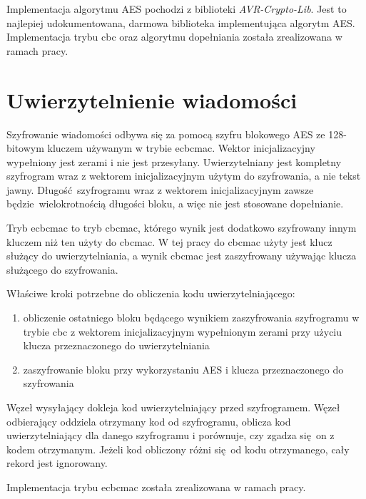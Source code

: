 Implementacja algorytmu AES pochodzi z biblioteki \emph{AVR-Crypto-Lib}. Jest to najlepiej udokumentowana, darmowa biblioteka implementująca algorytm AES. Implementacja trybu \gls{cbc} oraz algorytmu dopełniania została zrealizowana w ramach pracy.

\section{Uwierzytelnienie wiadomości}
\label{sec:auth}

Szyfrowanie wiadomości odbywa się za pomocą szyfru blokowego AES ze 128-bitowym kluczem używanym w trybie \gls{ecbcmac}. Wektor inicjalizacyjny wypełniony jest zerami i nie jest przesyłany. Uwierzytelniany jest kompletny szyfrogram wraz z wektorem inicjalizacyjnym użytym do szyfrowania, a nie tekst jawny. Długość szyfrogramu wraz z wektorem inicjalizacyjnym zawsze będzie wielokrotnością długości bloku, a więc nie jest stosowane dopełnianie.

Tryb \gls{ecbcmac} to tryb \gls{cbcmac}, którego wynik jest dodatkowo szyfrowany innym kluczem niż ten użyty do \gls{cbcmac}. W tej pracy do \gls{cbcmac} użyty jest klucz służący do uwierzytelniania, a wynik \gls{cbcmac} jest zaszyfrowany używając klucza służącego do szyfrowania.

Właściwe kroki potrzebne do obliczenia kodu uwierzytelniającego:

\begin{enumerate}
\item obliczenie ostatniego bloku będącego wynikiem zaszyfrowania szyfrogramu w trybie \gls{cbc} z wektorem inicjalizacyjnym wypełnionym zerami przy użyciu klucza przeznaczonego do uwierzytelniania
\item zaszyfrowanie bloku przy wykorzystaniu AES i klucza przeznaczonego do szyfrowania
\end{enumerate}

Węzeł wysyłający dokleja kod uwierzytelniający przed szyfrogramem. Węzeł odbierający oddziela otrzymany kod od szyfrogramu, oblicza kod uwierzytelniający dla danego szyfrogramu i porównuje, czy zgadza się on z kodem otrzymanym. Jeżeli kod obliczony różni się od kodu otrzymanego, cały rekord jest ignorowany.

Implementacja trybu \gls{ecbcmac} została zrealizowana w ramach pracy.
